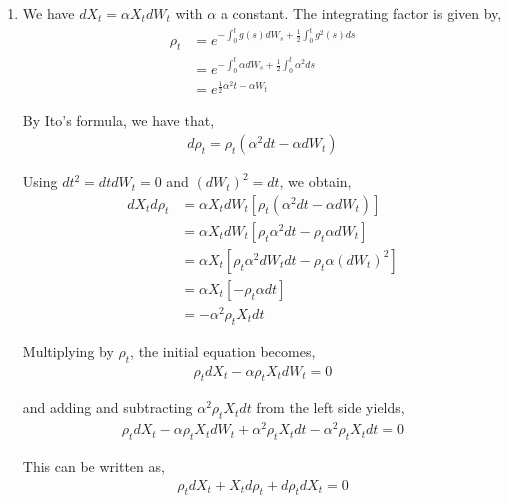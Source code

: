 \documentclass[12pt]{article}
\newenvironment{problem}[2][Problem]{\begin{trivlist}
\item[\hskip \labelsep {\bfseries #1}\hskip \labelsep {\bfseries #2.}]}{\end{trivlist}}
\begin{document}
\begin{problem}{29}
\end{problem}

\begin{problem}{30}
\end{problem}

\begin{problem}{31}
\end{problem}

\begin{enumerate}[\alph*)]

\item We have $dX_t = \alpha X_t dW_t$ with $\alpha$ a constant. The integrating factor is given by,
\begin{align*}
\rho_t &= e^{-\int_0^t g(s) dW_s + \frac{1}{2}\int_0^t g^2(s) ds}\\
&= e^{-\int_0^t \alpha dW_s + \frac{1}{2}\int_0^t \alpha^2 ds}\\
&= e^{\frac{1}{2} \alpha^2t - \alpha W_t}
\end{align*}

By Ito's formula, we have that,
\begin{align*}
d\rho_t = \rho_t(\alpha^2 dt - \alpha dW_t)
\end{align*}

Using $dt^2 = dt dW_t = 0$ and $(dW_t)^2 = dt$, we obtain,
\begin{align*}
dX_td\rho_t &= \alpha X_t dW_t[\rho_t(\alpha^2 dt - \alpha dW_t)]\\
&= \alpha X_t dW_t[\rho_t \alpha^2 dt - \rho_t \alpha dW_t]\\
&= \alpha X_t [\rho_t \alpha^2 dW_t dt - \rho_t \alpha (dW_t)^2]\\
&= \alpha X_t [-\rho_t \alpha dt]\\
&= -\alpha^2 \rho_t X_t dt
\end{align*}

Multiplying by $\rho_t$, the initial equation becomes,
\begin{align*}
\rho_tdX_t - \alpha\rho_tX_tdW_t = 0
\end{align*}

and adding and subtracting $\alpha^2\rho_tX_tdt$ from the left side yields,
\begin{align*}
\rho_tdX_t - \alpha\rho_tX_tdW_t + \alpha^2\rho_tX_tdt - \alpha^2\rho_tX_tdt = 0
\end{align*}

This can be written as,
\begin{align*}
\rho_tdX_t + X_td\rho_t + d\rho_t dX_t = 0
\end{align*}


\end{enumerate}
\end{document}
